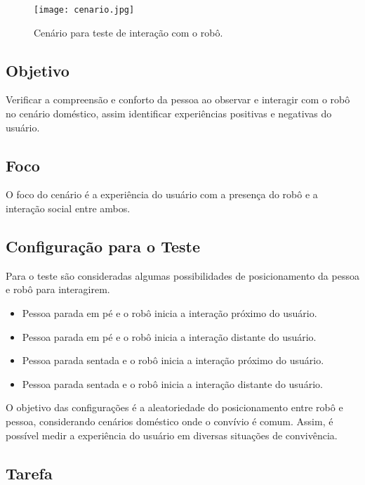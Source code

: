 \begin{figure}[ht!]
	\centering
	\begin{minipage}{\textwidth}
		\caption{Cenário para teste de interação com o robô.}
		\texttt{[image: cenario.jpg]}
		\label{fig:cenario}
	\end{minipage}
\end{figure}

\subsection{Objetivo}

Verificar a compreensão e conforto da pessoa ao observar e interagir com o robô no cenário doméstico, assim identificar experiências positivas e negativas do usuário.

\subsection{Foco}

O foco do cenário é a experiência do usuário com a presença do robô e a interação social entre ambos.

\subsection{Configuração para o Teste}

Para o teste são consideradas algumas possibilidades de posicionamento da pessoa e robô para interagirem.

\begin{itemize}
	\item Pessoa parada em pé e o robô inicia a interação próximo do usuário.
	\item Pessoa parada em pé e o robô inicia a interação distante do usuário.
	\item Pessoa parada sentada e o robô inicia a interação próximo do usuário.
	\item Pessoa parada sentada e o robô inicia a interação distante do usuário.
\end{itemize}

O objetivo das configurações é a aleatoriedade do posicionamento entre robô e pessoa, considerando cenários doméstico onde o convívio é comum. Assim, é possível medir a experiência do usuário em diversas situações de convivência.

\subsection{Tarefa}

